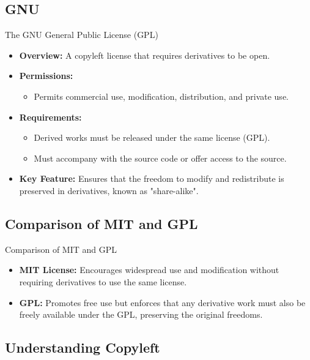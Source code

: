 \documentclass[10pt]{beamer}
\begin{document}
\subsection{GNU}
\begin{frame}{The GNU General Public License (GPL)}
    \begin{itemize}
        \item \textbf{Overview:} A copyleft license that requires derivatives to be open.
        \item \textbf{Permissions:}
            \begin{itemize}
                \item Permits commercial use, modification, distribution, and private use.
            \end{itemize}
        \item \textbf{Requirements:}
            \begin{itemize}
                \item Derived works must be released under the same license (GPL).
                \item Must accompany with the source code or offer access to the source.
            \end{itemize}
        \item \textbf{Key Feature:} Ensures that the freedom to modify and redistribute is preserved in derivatives, known as "share-alike".
    \end{itemize}
\end{frame}
\subsection{Comparison of MIT and GPL}
\begin{frame}{Comparison of MIT and GPL}
    \begin{itemize}
        \item \textbf{MIT License:} Encourages widespread use and modification without requiring derivatives to use the same license.
        \item \textbf{GPL:} Promotes free use but enforces that any derivative work must also be freely available under the GPL, preserving the original freedoms.
    \end{itemize}
\end{frame}
\subsection{Understanding Copyleft}
\end{document}

